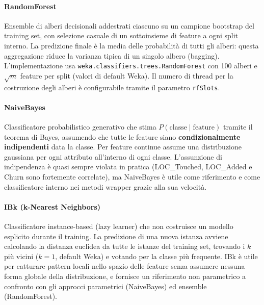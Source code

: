 \paragraph{RandomForest}

Ensemble di alberi decisionali addestrati ciascuno su un campione bootstrap del training
set, con selezione casuale di un sottoinsieme di feature a ogni split interno. La
predizione finale è la media delle probabilità di tutti gli alberi: questa aggregazione
riduce la varianza tipica di un singolo albero (bagging). L'implementazione usa
\texttt{weka.classifiers.trees.RandomForest} con 100 alberi e $\sqrt{m}$ feature per
split (valori di default Weka). Il numero di thread per la costruzione degli alberi è
configurabile tramite il parametro \texttt{rfSlots}.

\paragraph{NaiveBayes}

Classificatore probabilistico generativo che stima $P(\text{classe} \mid \text{feature})$
tramite il teorema di Bayes, assumendo che tutte le feature siano \textbf{condizionalmente
indipendenti} data la classe. Per feature continue assume una distribuzione gaussiana per
ogni attributo all'interno di ogni classe. L'assunzione di indipendenza è quasi sempre
violata in pratica (LOC\_Touched, LOC\_Added e Churn sono fortemente correlate), ma
NaiveBayes è utile come riferimento e come classificatore interno nei metodi wrapper grazie
alla sua velocità.

\paragraph{IBk (k-Nearest Neighbors)}

Classificatore instance-based (lazy learner) che non costruisce un modello esplicito
durante il training. La predizione di una nuova istanza avviene calcolando la distanza
euclidea da tutte le istanze del training set, trovando i $k$ più vicini ($k=1$, default
Weka) e votando per la classe più frequente. IBk è utile per catturare pattern locali
nello spazio delle feature senza assumere nessuna forma globale della distribuzione, e
fornisce un riferimento non parametrico a confronto con gli approcci parametrici (NaiveBayes)
ed ensemble (RandomForest).

